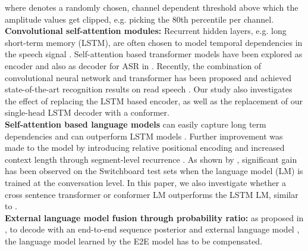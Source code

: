 \documentclass[a4paper]{article}
\begin{document}
\vspace{-5.9mm}

\vspace{-3.5mm}

\noindent where  denotes a randomly chosen, channel dependent threshold above which the amplitude values get clipped, e.g. picking the 80th percentile per channel.
\\ {\bf Convolutional self-attention modules:}
Recurrent hidden layers, e.g. long short-term memory (LSTM), are often chosen to model temporal dependencies in the speech signal \cite{Hochreiter97}.
Self-attention based transformer models have been explored as encoder and also as decoder  for ASR in \cite{Sperber2018,Povey2018,Zhang2020,Dong2018}.
Recently, the combination of convolutional neural network and transformer has been proposed and achieved state-of-the-art recognition results on read speech \cite{Gulati2020}.
Our study also investigates the effect of replacing the LSTM based encoder, as well as the replacement of our single-head LSTM decoder with a conformer.
\\ {\bf Self-attention based language models}
can easily capture long term dependencies and can outperform LSTM models \cite{AlRfou}.
Further improvement was made to the model by introducing relative positional encoding and increased context length through segment-level recurrence \cite{dai2019}.
As shown by \cite{Tuske2018,Xiong2018}, significant gain has been observed on the Switchboard test sets when the language model (LM) is trained at the conversation level.
In this paper, we also investigate whether a cross sentence transformer or conformer LM outperforms the LSTM LM, similar to \cite{irie19:asru}.
\\ {\bf External language model fusion through probability ratio:}
as proposed in \cite{McDermott2019}, to decode with an end-to-end sequence posterior  and external language model , the language model learned by the E2E model   has to be compensated.

\vspace{-4mm}

\vspace{-3mm}
\end{document}

